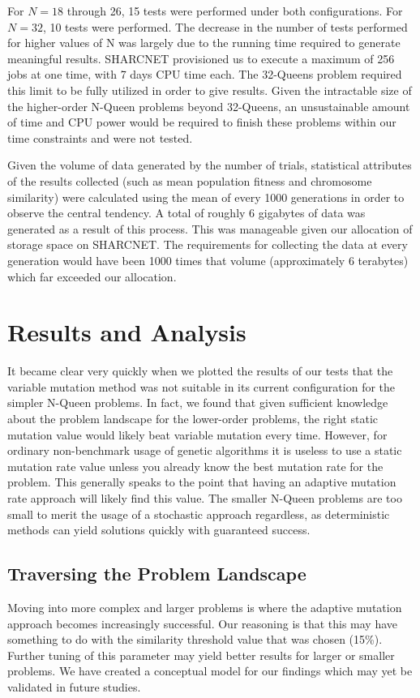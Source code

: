 \documentclass[conference]{IEEEtran}
\begin{document}
For $N = 18$ through 26, 15 tests were performed under both configurations. For $N = 32$, 10 tests were performed. The decrease in the number of tests performed for higher values of N was largely due to the running time required to generate meaningful results. SHARCNET provisioned us to execute a maximum of 256 jobs at one time, with 7 days CPU time each. The 32-Queens problem required this limit to be fully utilized in order to give results. Given the intractable size of the higher-order N-Queen problems beyond 32-Queens, an unsustainable amount of time and CPU power would be required to finish these problems within our time constraints and were not tested.

Given the volume of data generated by the number of trials, statistical attributes of the results collected (such as mean population fitness and chromosome similarity) were calculated using the mean of every 1000 generations in order to observe the central tendency. A total of roughly 6 gigabytes of data was generated as a result of this process. This was manageable given our allocation of storage space on SHARCNET. The requirements for collecting the data at every generation would have been 1000 times that volume (approximately 6 terabytes) which far exceeded our allocation.

\section{Results and Analysis}
It became clear very quickly when we plotted the results of our tests that the variable mutation method was not suitable in its current configuration for the simpler N-Queen problems. In fact, we found that given sufficient knowledge about the problem landscape for the lower-order problems, the right static mutation value would likely beat variable mutation every time. However, for ordinary non-benchmark usage of genetic algorithms it is useless to use a static mutation rate value unless you already know the best mutation rate for the problem. This generally speaks to the point that having an adaptive mutation rate approach will likely find this value. The smaller N-Queen problems are too small to merit the usage of a stochastic approach regardless, as deterministic methods can yield solutions quickly with guaranteed success.

\subsection{Traversing the Problem Landscape}
Moving into more complex and larger problems is where the adaptive mutation approach becomes increasingly successful. Our reasoning is that this may have something to do with the similarity threshold value that was chosen (15\%). Further tuning of this parameter may yield better results for larger or smaller problems. We have created a conceptual model for our findings which may yet be validated in future studies.
\end{document}
